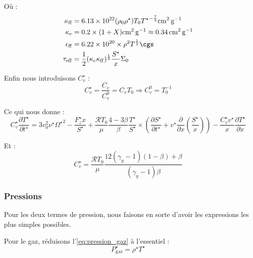 Où :
\begin{subequations}
    \begin{align}
        \kappa_\mathrm{ff} &= \num{6.13e22} (\rho_0 \rho^\star) {T_0 T^\star}^{-\frac{7}{2}} \si{\square\centi\meter\per\gram} \\
        \kappa_e &= 0.2 \times (1 + X) \si{\square\centi\meter\per\gram} \approx \SI{0.34}{\square\centi\meter\per\gram} \\
        \epsilon_\mathrm{ff} &= \num{6.22e20} \times \rho^2 T^\frac{1}{2} \si{\cgs} \\
        \tau_\mathrm{eff} &= \frac{1}{2} (\kappa_e \kappa_\mathrm{ff})^\frac{1}{2} \frac{S^\star}{x} \Sigma_0
    \end{align}
\end{subequations}

Enfin nous introduisons $C_v^\star$ :
\begin{equation}
    C_v^\star = \frac{C_v}{C_v^0} = C_v T_0 \Rightarrow C_v^0 = T_0^{-1}
\end{equation} 

Ce qui nous donne :
\begin{equation}
    C_v^\star \frac{\partial T^{\star}}{\partial t^{\star}} =
    3 v_0^2 \nu^\star {\Omega^\star}^2 - \frac{F_z^\star x}{S^\star} +
    \frac{\mathcal{R} T_0}{\mu} \frac{4-3\beta}{\beta} \frac{T^\star}{S^\star} \times
    \left( \frac{\partial S^\star}{\partial t^\star} + v^\star \frac{\partial}{\partial x} \left(\frac{S^\star}{x}\right) \right) -
    \frac{C_v^\star v^\star}{x} \frac{\partial T^\star}{\partial x}
\end{equation}

Et :
\begin{equation}
    C_v^\star = \frac{\mathcal{R} T_0}{\mu} \frac{12 (\gamma_g - 1)(1 - \beta) + \beta}{(\gamma_g - 1) \beta}
\end{equation}

\subsubsection{Pressions}

Pour les deux termes de pression, nous faisons en sorte d’avoir les expressions
les plus simples possibles.

Pour le gaz, réduisons l’\cref{eq:pression_gaz} à l’essentiel :
\begin{equation}
    P_\mathrm{gaz}^\star = \rho^\star T^\star
\end{equation}

